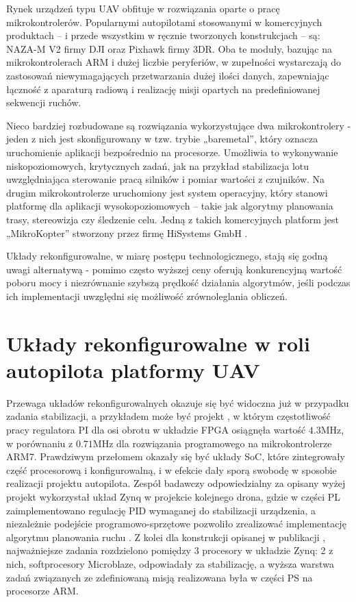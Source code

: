 Rynek urządzeń typu UAV obfituje w rozwiązania oparte o pracę mikrokontrolerów. Popularnymi autopilotami stosowanymi w komercyjnych produktach -- i przede wszystkim w ręcznie tworzonych konstrukcjach -- są: NAZA-M V2 firmy DJI oraz Pixhawk firmy 3DR. Oba te moduły, bazując na mikrokontrolerach ARM i dużej liczbie peryferiów, w zupełności wystarczają do zastosowań niewymagających przetwarzania dużej ilości danych, zapewniając łączność z aparaturą radiową i realizację misji opartych na predefiniowanej sekwencji ruchów. 

Nieco bardziej rozbudowane są rozwiązania wykorzystujące dwa mikrokontrolery - jeden z nich jest skonfigurowany w tzw. trybie „baremetal”, który oznacza uruchomienie aplikacji bezpośrednio na procesorze. Umożliwia to wykonywanie niskopoziomowych, krytycznych zadań, jak na przykład stabilizacja lotu uwzględniająca sterowanie pracą silników i pomiar wartości z czujników. Na drugim mikrokontrolerze uruchomiony jest system operacyjny, który stanowi platformę dla aplikacji wysokopoziomowych -- takie jak algorytmy planowania trasy, stereowizja czy śledzenie celu. Jedną z takich komercyjnych platform jest „MikroKopter” stworzony przez firmę HiSystems GmbH \cite{MikroKopter}.

Układy rekonfigurowalne, w miarę postępu technologicznego, stają się godną uwagi alternatywą - pomimo często wyższej ceny oferują konkurencyjną wartość poboru mocy i niezrównanie szybszą prędkość działania algorytmów, jeśli podczas ich implementacji uwzględni się możliwość zrównoleglania obliczeń. 

\section{Układy rekonfigurowalne w roli autopilota platformy UAV}

Przewaga układów rekonfigurowalnych okazuje się być widoczna już w przypadku zadania stabilizacji, a przykładem może być projekt \cite{Eizad}, w którym częstotliwość pracy regulatora PI dla osi obrotu w układzie FPGA osiągnęła wartość $4.3$MHz, w porównaniu z $0.71$MHz dla rozwiązania programowego na mikrokontrolerze ARM7. Prawdziwym przełomem okazały się być układy SoC, które zintegrowały część procesorową i konfigurowalną, i w efekcie dały sporą swobodę w sposobie realizacji projektu autopilota. Zespół badawczy odpowiedzialny za opisany wyżej projekt wykorzystał układ Zynq w projekcie kolejnego drona, gdzie w części PL zaimplementowano regulację PID wymaganej do stabilizacji urządzenia, a niezależnie podejście programowo-sprzętowe pozwoliło zrealizować implementację algorytmu planowania ruchu \cite{Eizad2}. Z kolei dla konstrukcji opisanej w publikacji \cite{Schlender}, najważniejsze zadania rozdzielono pomiędzy 3 procesory w układzie Zynq: 2 z nich, softprocesory Microblaze, odpowiadały za stabilizację, a wyższa warstwa zadań związanych ze zdefiniowaną misją realizowana była w części PS na procesorze ARM.


